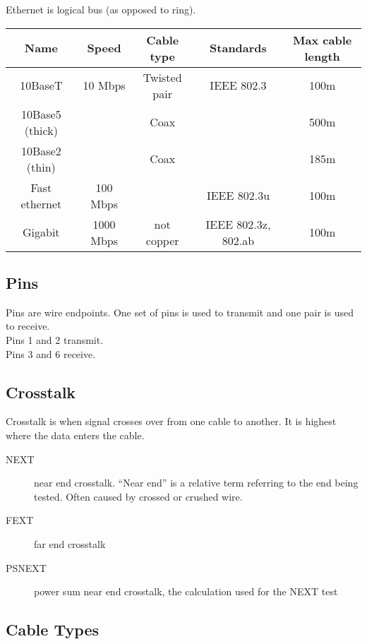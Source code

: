 Ethernet is logical bus (as opposed to ring).\\

\begin{tabular}{ | c | c | c | c | c | }
\hline
Name & Speed & Cable type & Standards & Max cable length \\ \hline
10BaseT & 10 Mbps & Twisted pair & IEEE 802.3 & 100m \\ \hline
10Base5 (thick) & & Coax & & 500m \\ \hline
10Base2 (thin) & & Coax & & 185m \\ \hline
Fast ethernet & 100 Mbps & & IEEE 802.3u & 100m \\ \hline
Gigabit & 1000 Mbps & not copper & IEEE 802.3z, 802.ab & 100m \\ \hline
\end{tabular}

\subsection{Pins}

Pins are wire endpoints. One set of pins is used to transmit and one pair
is used to receive.\\

Pins 1 and 2 transmit.\\

Pins 3 and 6 receive.

\subsection{Crosstalk}

Crosstalk is when signal crosses over from one cable to another. It is highest
where the data enters the cable.

\begin{description}

\item[NEXT]
near end crosstalk. ``Near end'' is a relative term referring to the end being
tested. Often caused by crossed or crushed wire.

\item[FEXT]
far end crosstalk

\item[PSNEXT]
power sum near end crosstalk, the calculation used for the NEXT test

\end{description}

\subsection{Cable Types}

